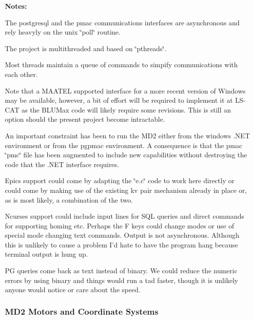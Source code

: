 {\bfseries Notes:} 
\begin{DoxyItemize}
\item The postgresql and the pmac communications interfaces are asynchronous and rely heavyly on the unix \char`\"{}poll\char`\"{} routine. 


\item The project is multithreaded and based on \char`\"{}pthreads\char`\"{}.


\item Most threads maintain a queue of commands to simpify communications with each other.


\item Note that a MAATEL supported interface for a more recent version of Windows may be available, however, a bit of effort will be required to implement it at LS-\/CAT as the BLUMax code will likely require some revisions. This is still an option should the present project become intractable.


\item An important constraint has been to run the MD2 either from the windows .NET environment or from the pgpmac environment. A consequence is that the pmac \char`\"{}pmc\char`\"{} file has been augmented to include new capabilities without destroying the code that the .NET interface requires.


\item Epics support could come by adapting the \char`\"{}e.c\char`\"{} code to work here directly or could come by making use of the existing kv pair mechanism already in place or, as is most likely, a combination of the two.


\item Ncurses support could include input lines for SQL queries and direct commands for supporting homing etc. Perhaps the F keys could change modes or use of special mode changing text commands. Output is not asynchronous. Although this is unlikely to cause a problem I'd hate to have the program hang because terminal output is hung up.


\item PG queries come back as text instead of binary. We could reduce the numeric errors by using binary and things would run a tad faster, though it is unlikely anyone would notice or care about the speed. 


\end{DoxyItemize}

\subsubsection*{MD2 Motors and Coordinate Systems}


